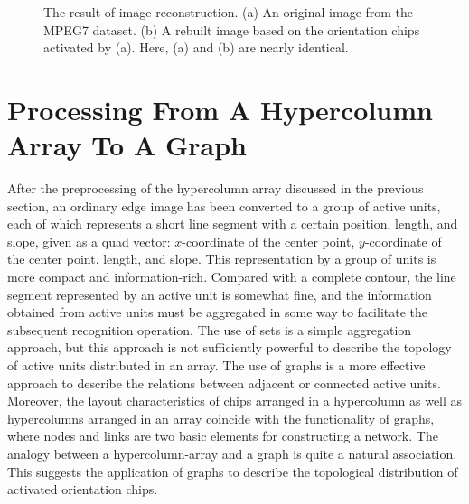 \documentclass[journal]{IEEEtran}
\begin{document}
\begin{figure}[!t]
\centering
{}
\hfil
{}
\caption{The result of image reconstruction. (a) An original image from the MPEG7 dataset. (b) A rebuilt image based on the orientation chips activated by (a). Here, (a) and (b) are nearly identical.}
\label{fig:7}
\end{figure}

\section{Processing From A Hypercolumn Array To A Graph}

After the preprocessing of the hypercolumn array discussed in the previous section, 
an ordinary edge image has been converted to a group of active units, 
each of which represents a short line segment with a certain position, length, and slope, 
given as a quad vector: $x$-coordinate of the center point, 
$y$-coordinate of the center point, length, and slope. 
This representation by a group of units is more compact and information-rich. 
Compared with a complete contour, the line segment represented by an active unit is somewhat fine, 
and the information obtained from active units must be aggregated in some way to facilitate the subsequent recognition operation. 
The use of sets is a simple aggregation approach, 
but this approach is not sufficiently powerful to describe the topology of active units distributed in an array. 
The use of graphs is a more effective approach to describe the relations between adjacent or connected active units. 
Moreover, the layout characteristics of chips arranged in a hypercolumn as well as hypercolumns arranged in an array coincide with the functionality of graphs, 
where nodes and links are two basic elements for constructing a network. 
The analogy between a hypercolumn-array and a graph is quite a natural association. 
This suggests the application of graphs to describe the topological distribution of activated orientation chips.
\end{document}
